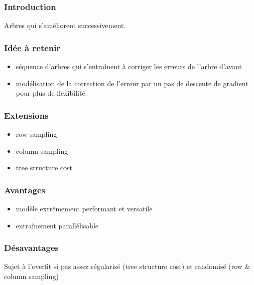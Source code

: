 \begin{frame}
  \frametitle{Introduction}
  Arbres qui s'améliorent successivement.
\end{frame}

\begin{frame}
  \frametitle{Idée à retenir}
  \begin{itemize}
  \item séquence d'arbres qui s'entraînent à corriger les erreurs de
    l'arbre d'avant
  \item modélisation de la correction de l'erreur par un pas de
    descente de gradient pour plus de flexibilité.
  \end{itemize}
   
\end{frame}

\begin{frame}
  \frametitle{Extensions}
  \begin{itemize}
  \item row sampling
  \item column sampling
  \item tree structure cost
  \end{itemize}
\end{frame}

\begin{frame}
  \frametitle{Avantages}
  \begin{itemize}
  \item modèle extrêmement performant et versatile
  \item entraînement parallélisable
  \end{itemize}
\end{frame}

\begin{frame}
  \frametitle{Désavantages}
  Sujet à l'overfit si pas assez régularisé (tree structure cost) et
  randomisé (row \& column sampling)
\end{frame}
